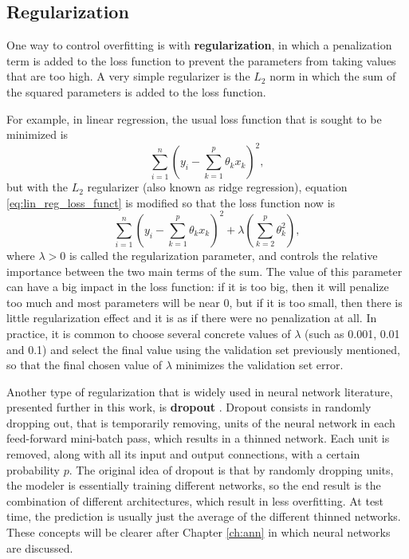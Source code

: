 \subsection{Regularization}

One way to control overfitting is with \textbf{regularization}, in which a penalization term is added to the loss function to prevent the parameters from taking values that are too high. A very simple regularizer is the $L_2$ norm in which the sum of the squared parameters is added to the loss function.

For example, in linear regression, the usual loss function that is sought to be minimized is
\begin{equation}
  \label{eq:lin_reg_loss_funct}
  \sum_{i = 1}^n{ \left( y_i - \sum_{k = 1}^p  \theta_k x_k \right) ^ 2},
\end{equation}
but with the $L_2$ regularizer (also known as ridge regression), equation \eqref{eq:lin_reg_loss_funct} is modified so that the loss function now is
\begin{equation}
  \label{eq:lin_reg_loss_funct_reg}
  \sum_{i = 1}^n{ \left( y_i - \sum_{k = 1}^p \theta_k x_k \right) ^ 2}
  + \lambda \left( \sum_{k = 2}^p \theta_k^2 \right),
\end{equation}
where $\lambda > 0$ is called the regularization parameter, and controls the relative importance between the two main terms of the sum. The value of this parameter can have a big impact in the loss function: if it is too big, then it will penalize too much and most parameters will be near 0, but if it is too small, then there is little regularization effect and it is as if there were no penalization at all. In practice, it is common to choose several concrete values of $\lambda$ (such as 0.001, 0.01 and 0.1) and select the final value using the validation set previously mentioned, so that the final chosen value of $\lambda$ minimizes the validation set error.

Another type of regularization that is widely used in neural network literature, presented further in this work, is \textbf{dropout} \cite{srivastava2014dropout}. Dropout consists in randomly dropping out, that is temporarily removing, units of the neural network in each feed-forward mini-batch pass, which results in a thinned network. Each unit is removed, along with all its input and output connections, with a certain probability $p$. The original idea of dropout is that by randomly dropping units, the modeler is essentially training different networks, so the end result is the combination of different architectures, which result in less overfitting. At test time, the prediction is usually just the average of the different thinned networks. These concepts will be clearer after Chapter \ref{ch:ann} in which neural networks are discussed.
